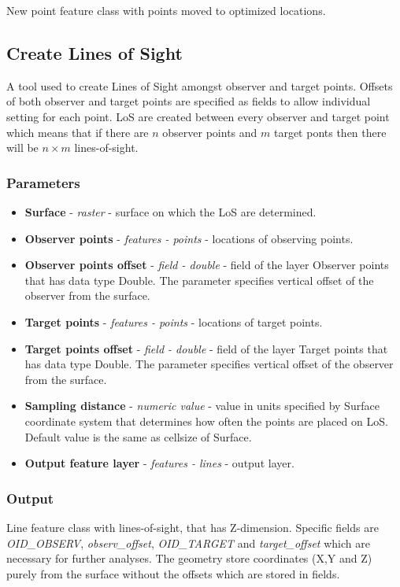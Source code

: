 \documentclass[]{article}
\begin{document}
New point feature class with points moved to optimized locations.

\subsection{Create Lines of Sight}
\label{Sec:createLoS}
A tool used to create Lines of Sight amongst observer and target points. Offsets of both observer and target points are specified as fields to allow individual setting for each point. LoS are created between every observer and target point which means that if there are $n$ observer points and $m$ target ponts then there will be $n \times m$ lines-of-sight.

\subsubsection{Parameters}
\begin{itemize}
	\item \textbf{Surface} - \textit{raster} - surface on which the LoS are determined.
	\item \textbf{Observer points} - \textit{features - points} - locations of observing points.
	\item \textbf{Observer points offset} - \textit{field - double} - field of the layer Observer points that has data type Double. The parameter specifies vertical offset of the observer from the surface.
	\item \textbf{Target points} -  \textit{features - points} - locations of target points.
	\item \textbf{Target points offset} - \textit{field - double} - field of the layer Target points that has data type Double. The parameter specifies vertical offset of the observer from the surface. 
	\item \textbf{Sampling distance} - \textit{numeric value} - value in units specified by Surface coordinate system that determines how often the points are placed on LoS. Default value is the same as cellsize of Surface.
	\item \textbf{Output feature layer} - \textit{features - lines} - output layer.
\end{itemize}

\subsubsection{Output}

Line feature class with lines-of-sight, that has Z-dimension. Specific fields are \textit{OID\_OBSERV}, \textit{observ\_offset}, \textit{OID\_TARGET} and \textit{target\_offset} which are necessary for further analyses. The geometry store coordinates (X,Y and Z) purely from the surface without the offsets which are stored in fields.
\end{document}
